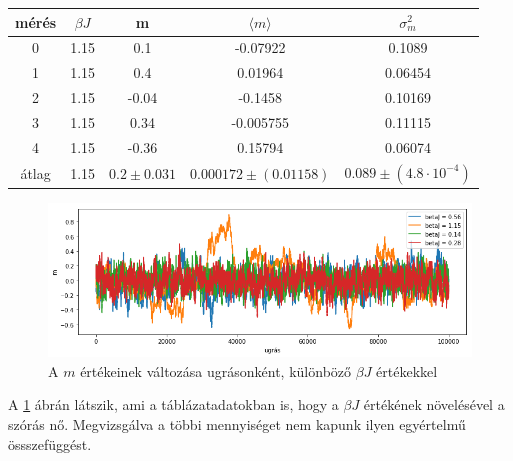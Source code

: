 \documentclass[12pt]{article}
\begin{document}
\begin{center}
\begin{tabular}{|c|c|c|c|c|}\hline
mérés & $\beta J$ & m& $ \langle m \rangle $ & $\sigma^2_m$ \\ \hline
0&1.15&0.1&-0.07922&0.1089 \\ \hline
1&1.15&0.4&0.01964&0.06454\\ \hline
2&1.15&-0.04& -0.1458&0.10169 \\ \hline
3& 1.15&0.34&-0.005755&0.11115 \\ \hline
4&1.15&-0.36&0.15794&0.06074\\ \hline
átlag&1.15&$0.2\pm0.031$&$0.000172\pm(0.01158)$&$0.089\pm(4.8\cdot 10^{-4})$\\ \hline
\end{tabular}
\end{center}

\begin{figure}[H]
\centering
\includegraphics[width = 150mm]{four}

\caption{A $m$ értékeinek változása ugrásonként, különböző $\beta J$ értékekkel}
\label{fig: elso}
\end{figure}

A \ref{fig: elso} ábrán látszik, ami a táblázatadatokban is, hogy a $\beta J$ értékének növelésével a szórás nő. Megvizsgálva a többi mennyiséget nem kapunk ilyen egyértelmű össszefüggést.
\end{document}
